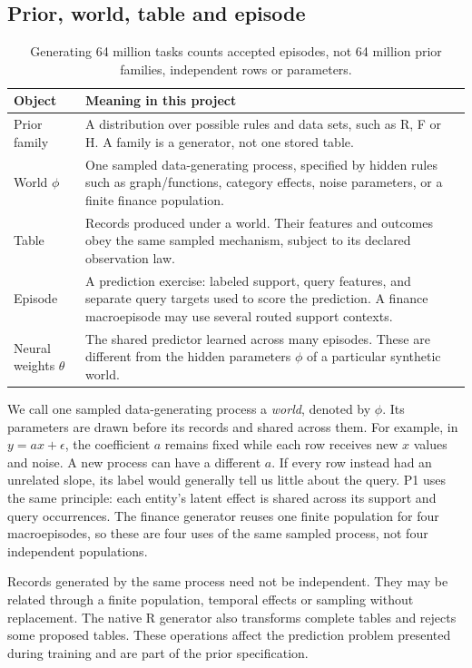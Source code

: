 \documentclass[11pt]{article}
\begin{document}
\subsection{Prior, world, table and episode}

\begin{table}[ht]
\centering\small
\begin{tabularx}{\linewidth}{@{}p{.15\linewidth}Y@{}}
\toprule Object & Meaning in this project\\
\midrule
Prior family & A distribution over possible rules and data sets, such as R, F or H. A family is a generator, not one stored table.\\
World $\phi$ & One sampled data-generating process, specified by hidden rules such as graph/functions, category effects, noise parameters, or a finite finance population.\\
Table & Records produced under a world. Their features and outcomes obey the same sampled mechanism, subject to its declared observation law.\\
Episode & A prediction exercise: labeled support, query features, and separate query targets used to score the prediction. A finance macroepisode may use several routed support contexts.\\
Neural weights $\theta$ & The shared predictor learned across many episodes. These are different from the hidden parameters $\phi$ of a particular synthetic world.\\
\bottomrule
\end{tabularx}
\caption{Generating 64 million tasks counts accepted episodes, not 64 million prior families, independent rows or parameters.}
\end{table}

We call one sampled data-generating process a \emph{world}, denoted by $\phi$. Its parameters are drawn before its records and shared across them. For example, in $y=ax+\epsilon$, the coefficient $a$ remains fixed while each row receives new $x$ values and noise. A new process can have a different $a$. If every row instead had an unrelated slope, its label would generally tell us little about the query. P1 uses the same principle: each entity's latent effect is shared across its support and query occurrences. The finance generator reuses one finite population for four macroepisodes, so these are four uses of the same sampled process, not four independent populations.

Records generated by the same process need not be independent. They may be related through a finite population, temporal effects or sampling without replacement. The native R generator also transforms complete tables and rejects some proposed tables. These operations affect the prediction problem presented during training and are part of the prior specification.
\end{document}
